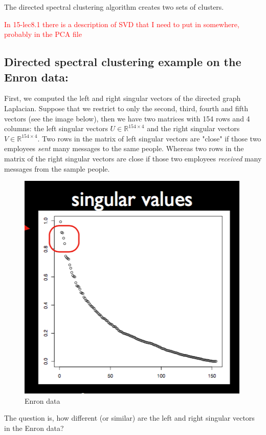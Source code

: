 The directed spectral clustering algorithm creates two sets of clusters.

\textcolor{red}{In 15-lec8.1 there is a description of SVD that I need to put in somewhere, probably in the PCA file}


\subsection*{Directed spectral clustering example on the Enron data:}

First, we computed the left and right singular vectors of the directed graph Laplacian. Suppose that we restrict to only the second, third, fourth and fifth vectors (see the image below), then we have two matrices with 154 rows and 4 columns: the left singular vectors $U \in \mathbb{R}^{154 \times 4}$ and the right singular vectors $V \in \mathbb{R}^{154 \times 4}$. Two rows in the matrix of left singular vectors are "close" if those two employees \emph{sent} many messages to the same people. Whereas two rows in the matrix of the right singular vectors are close if those two employees \emph{received} many messages from the sample people. 


\begin{figure}[H]
\begin{center}
\includegraphics[scale=0.4]{singular.png}
\end{center}
\caption{Enron data}
\label{fig:Enron}
\end{figure}

The question is, how different (or similar) are the left and right singular vectors in the Enron data?

